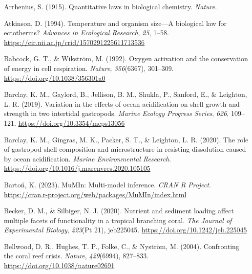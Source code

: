 \documentclass{CSUNthesis}
\begin{document}
\vspace{0.1em}

Arrhenius, S. (1915). Quantitative laws in biological chemistry. \textit{Nature}.

\vspace{0.1em}

Atkinson, D. (1994). Temperature and organism size---A biological law for ectotherms? \textit{Advances in Ecological Research}, \textit{25}, 1--58. \url{https://cir.nii.ac.jp/crid/1570291225611713536}

\vspace{0.1em}

Babcock, G. T., \& Wikström, M. (1992). Oxygen activation and the conservation of energy in cell respiration. \textit{Nature}, \textit{356}(6367), 301--309. \url{https://doi.org/10.1038/356301a0}

\vspace{0.1em}

Barclay, K. M., Gaylord, B., Jellison, B. M., Shukla, P., Sanford, E., \& Leighton, L. R. (2019). Variation in the effects of ocean acidification on shell growth and strength in two intertidal gastropods. \textit{Marine Ecology Progress Series}, \textit{626}, 109--121. \url{https://doi.org/10.3354/meps13056}

\vspace{0.1em}

Barclay, K. M., Gingras, M. K., Packer, S. T., \& Leighton, L. R. (2020). The role of gastropod shell composition and microstructure in resisting dissolution caused by ocean acidification. \textit{Marine Environmental Research}. \url{https://doi.org/10.1016/j.marenvres.2020.105105}

\vspace{0.1em}

Bartoń, K. (2023). MuMIn: Multi-model inference. \textit{CRAN R Project}. \url{https://cran.r-project.org/web/packages/MuMIn/index.html}

\vspace{0.1em}

Becker, D. M., \& Silbiger, N. J. (2020). Nutrient and sediment loading affect multiple facets of functionality in a tropical branching coral. \textit{The Journal of Experimental Biology}, \textit{223}(Pt 21), jeb225045. \url{https://doi.org/10.1242/jeb.225045}

\vspace{0.1em}

Bellwood, D. R., Hughes, T. P., Folke, C., \& Nyström, M. (2004). Confronting the coral reef crisis. \textit{Nature}, \textit{429}(6994), 827--833. \url{https://doi.org/10.1038/nature02691}
\end{document}
